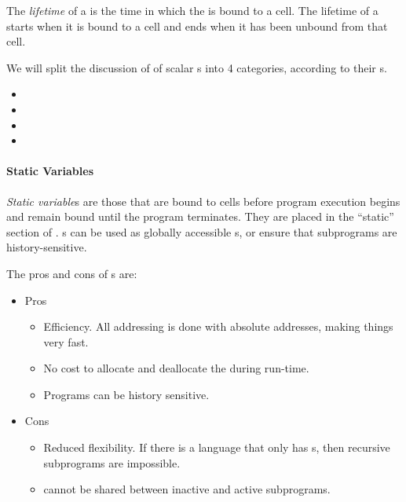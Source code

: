\begin{definition}[Lifetime]\label{def:Variable_Lifetime}
  The \emph{lifetime} of a  is the time in which the  is bound to a  cell.
  The lifetime of a  starts when it is bound to a cell and ends when it has been unbound from that cell.

  We will split the discussion of  of scalar s into 4 categories, according to their s.
  \begin{itemize}[noitemsep]
  \item {}
  \item {}
  \item {}
  \item {}
  \end{itemize}
\end{definition}

\paragraph{Static Variables}\label{par:Static_Variable_Binding_Lifetime}
\begin{definition}\label{def:Static_Variable_Binding_Lifetime}
  \emph{Static variable}s are those that are bound to  cells before program execution begins and remain bound until the program terminates.
  They are placed in the ``static'' section of .
  s can be used as globally accessible s, or ensure that subprograms are history-sensitive.

  The pros and cons of s are:
  \begin{itemize}[noitemsep]
  \item Pros
    \begin{itemize}[noitemsep]
    \item Efficiency. All  addressing is done with absolute addresses, making things very fast.
    \item No cost to allocate and deallocate the  during run-time.
    \item Programs can be history sensitive.
    \end{itemize}
  \item Cons
    \begin{itemize}[noitemsep]
    \item Reduced flexibility. If there is a language that only has s, then recursive subprograms are impossible.
    \item {} cannot be shared between inactive and active subprograms.
    \end{itemize}
  \end{itemize}
\end{definition}


